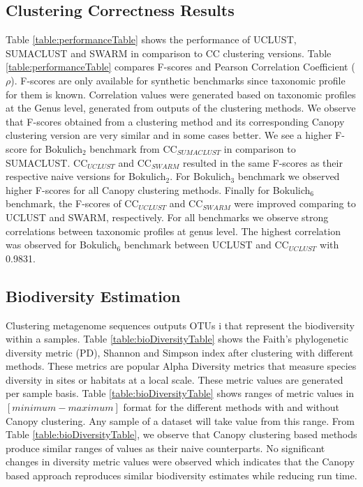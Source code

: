 \documentclass[10pt, conference, compsocconf]{IEEEtran}
\begin{document}
\subsection{\textbf{Clustering Correctness Results}}
Table \ref{table:performanceTable} shows the performance of  UCLUST, SUMACLUST and SWARM  in comparison to CC clustering versions. Table 
\ref{table:performanceTable} compares F-scores and Pearson Correlation Coefficient ($\rho$). F-scores 
are only available for synthetic 
benchmarks since taxonomic profile for them is known. Correlation values were generated 
based on taxonomic profiles at the 
Genus level, 
generated from outputs of the  clustering methods. We observe 
that F-scores obtained from a clustering method and its corresponding Canopy clustering version are very similar and in some 
cases better. We see a higher F-score for Bokulich$_2$ benchmark from CC$_{SUMACLUST}$ in comparison to SUMACLUST.  CC$_{UCLUST}$ and CC$_{SWARM}$ resulted in the 
same F-scores as their respective naive versions for Bokulich$_2$. For Bokulich$_3$ benchmark we observed higher F-scores for all Canopy 
clustering methods. Finally for Bokulich$_6$ benchmark, the 
F-scores of CC$_{UCLUST}$ and CC$_{SWARM}$ were improved comparing to UCLUST and SWARM, respectively.
%
For all benchmarks we observe strong correlations between taxonomic profiles at genus level. The highest correlation was observed for 
Bokulich$_6$ benchmark between UCLUST and CC$_{UCLUST}$ with 0.9831. 


\subsection{\textbf{Biodiversity Estimation}} Clustering metagenome sequences outputs OTUs i
that represent the 
biodiversity within a 
samples. Table 
\ref{table:bioDiversityTable} shows the 
Faith’s phylogenetic diversity metric (PD), Shannon and Simpson index after clustering
with different methods. These metrics are 
popular Alpha Diversity metrics that measure species diversity in sites or habitats at 
a local scale. These metric values are generated per sample basis. Table \ref{table:bioDiversityTable} shows ranges of metric values
in $[minimum-maximum]$ format  for the different 
methods with and without Canopy clustering. Any sample of a dataset will take value from this range.
%
From Table  \ref{table:bioDiversityTable}, we observe 
that Canopy clustering based methods produce similar ranges of values as their naive counterparts. No significant changes in diversity metric values 
were observed which indicates that the 
Canopy based approach reproduces similar biodiversity estimates while reducing run time.
\end{document}
